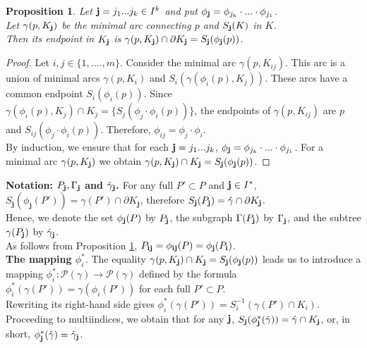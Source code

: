 \documentclass[11pt,reqno]{amsart}
\newtheorem{proposition}[theorem]{Proposition}
\newcommand{\bj}{{\bm j}}
\newcommand{\hga}{{\hat\gamma}}
\begin{document}
\begin{proposition}\label{fybj}
 Let ${\bf j}=j_1...j_k\in I^k$ and put $\phi_{\bf {j}}=\phi_{j_k}\cdot...\cdot\phi_{j_1}$.\\
Let $\gamma(p, K_{\bf j})$  be the
 minimal arc connecting $p$ and $S_{\bf j}(K)$ in  $K$.  \\
 Then its endpoint in $K_{\bf j}$  is $\gamma(p, K_{\bf j})\cap\partial K_{\bf j}=S_{\bf j}(\phi_{\bf j}(p))$.
 
 \end{proposition}
\begin{proof}
Let $i,j\in \{1,....,m\}$. Consider the minimal arc $\gamma(p,K_{ij})$. 
This arc is a union of minimal arcs $\gamma(p, K_i)$ and $S_i(\gamma(\phi_i(p), K_{j})) $.  
These arcs have a common endpoint $S_i(\phi_i(p))$. 
Since 
$\gamma(\phi_i(p), K_{j})\cap K_j=\{S_j(\phi_j\cdot \phi_i(p))\}$, 
the endpoints of $\gamma(p,K_{ij})$  are $p$ and $S_{ij}(\phi_j\cdot\phi_i(p))$. 
Therefore,  $\phi_{ij}=\phi_j\cdot\phi_i$.\\
By induction, we ensure that for each ${\bf {j}}=j_1...j_k$,  $\phi_{\bf {j}}=\phi_{j_k}\cdot...\cdot\phi_{j_1}$. 
For a minimal arc $\gamma(p,K_{\bf j})$ 
we obtain $\gamma(p,K_{\bf j})\cap K_{\bf j}=S_{\bf j}(\phi_{\bf j}(p))$. \end{proof}

 

{\bf Notation: $P_{\bf j},\Gamma_{\bf j}$ and $\hga_{\bf j}$.} For any full $P'\subset P$ and ${\bf{j}}\in I^*$,\\
$S_\bj(\phi_\bj(P'))=\gamma(P')\cap \partial K_\bj$, therefore $S_{\bf{j}}(P_{\bf{j}})=\hga \cap \partial K_{\bf{j}}$.\\
Hence, we denote the set $\phi_{\bf{j}}(P)$ by $P_{\bf{j}}$,  the subgraph $\Gamma(P_{\bf{j}})$ by $\Gamma_{\bf{j}}$, and  the subtree $ \gamma(P_{\bf{j}})$ by $\hga_{\bf{j}}$.\\
As  follows from Proposition \ref{fybj},
$P_{\bf{ij}}=\phi_{\bf{ij}}(P)=\phi_{\bf{j}}(P_{\bf{i}})$.\\

 {\bf The mapping $\phi^*_i$}.  The 
 equality $\gamma(p,K_{\bf j})\cap K_{\bf j}=S_{\bf j}(\phi_{\bf j}(p))$ leads us to introduce a  mapping
$\phi^*_i:\mathcal{P}(\gamma)\to
\mathcal{P}(\gamma)$ defined by the formula\\
$\phi^*_i(\gamma(P'))=\gamma(\phi_i(P'))$ for each  full $P'\subset P$.\\
Rewriting its right-hand side   gives
$\phi^*_i( \gamma(P'))=S_i^{-1}( \gamma(P')\cap K_i)$. Proceeding  to multiindices, we obtain that for any   $\bf {j}$,
$S_{\bf {j}}(\phi_{\bf {j}}^*(\hga))=\hga\cap K_{\bf {j}}$, or, in short,   $\phi^*_{\bf {j}}(\hga)=\hat \gamma_{\bf {j}}$.
\end{document}
